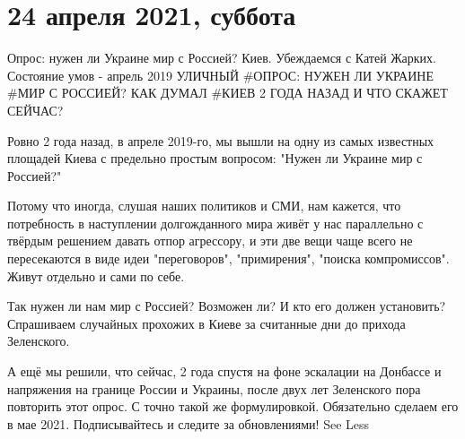  
 
 
 
 

\section{24 апреля 2021, суббота}
\label{sec:24_04_2021}




Опрос: нужен ли Украине мир с Россией? Киев. Убеждаемся с Катей Жарких. Состояние умов - апрель 2019
УЛИЧНЫЙ #ОПРОС: НУЖЕН ЛИ УКРАИНЕ #МИР С РОССИЕЙ?
КАК ДУМАЛ #КИЕВ 2 ГОДА НАЗАД И ЧТО СКАЖЕТ СЕЙЧАС?

Ровно 2 года назад, в апреле 2019-го, мы вышли на одну из самых известных площадей Киева с предельно простым вопросом: "Нужен ли Украине мир с Россией?"

Потому что иногда, слушая наших политиков и СМИ, нам кажется, что потребность в наступлении долгожданного мира живёт у нас параллельно с твёрдым решением давать отпор агрессору, и эти две вещи чаще всего не пересекаются в виде идеи "переговоров", "примирения", "поиска компромиссов". Живут отдельно и сами по себе.

Так нужен ли нам мир с Россией? Возможен ли? И кто его должен установить? Спрашиваем случайных прохожих в Киеве за считанные дни до прихода Зеленского.

А ещё мы решили, что сейчас, 2 года спустя на фоне эскалации на Донбассе и напряжения на границе России и Украины, после двух лет Зеленского пора повторить этот опрос. С точно такой же формулировкой.
Обязательно сделаем его в мае 2021. Подписывайтесь и следите за обновлениями! See Less
